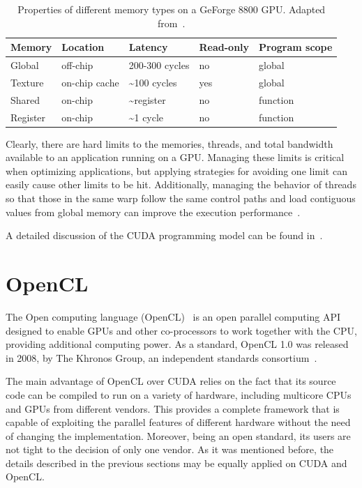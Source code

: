 \begin{table}
\caption{Properties of different memory types on a GeForge 8800 GPU. Adapted
from~\cite{Ryoo-Optimization_principles_of_a_GPU_using_CUDA:2008}.\label{tab:02-GPU_memory_properties}}


\centering

\begin{tabular}{lllll}
\hline 
Memory & Location & Latency & Read-only & Program scope\tabularnewline[\doublerulesep]
\hline 
Global & off-chip & 200-300 cycles & no & global\tabularnewline
Texture & on-chip cache & \textasciitilde{}100 cycles & yes & global\tabularnewline
Shared & on-chip & \textasciitilde{}register & no & function\tabularnewline
Register & on-chip & \textasciitilde{}1 cycle & no & function\tabularnewline
\hline 
\end{tabular}
\end{table}


Clearly, there are hard limits to the memories, threads, and total
bandwidth available to an application running on a GPU. Managing these
limits is critical when optimizing applications, but applying strategies
for avoiding one limit can easily cause other limits to be hit. Additionally,
managing the behavior of threads so that those in the same warp follow
the same control paths and load contiguous values from global memory
can improve the execution performance~\cite{Ryoo-Optimization_principles_of_a_GPU_using_CUDA:2008}.

A detailed discussion of the CUDA programming model can be found in~\cite{Farber-CUDA_application_design_and_development:2011}.


\section{OpenCL \label{sub:02-OpenCL}}

The Open computing language (OpenCL)~\cite{Stone_OpenCL.A.parallel.programming.standard:2010}
is an open parallel computing API designed to enable GPUs and other
co-processors to work together with the CPU, providing additional
computing power. As a standard, OpenCL 1.0 was released in 2008, by
The Khronos Group, an independent standards consortium~\cite{Munshi_The.OpenCL.specification:2009}.

The main advantage of OpenCL over CUDA relies on the fact that its
source code can be compiled to run on a variety of hardware, including
multicore CPUs and GPUs from different vendors. This provides a complete
framework that is capable of exploiting the parallel features of different
hardware without the need of changing the implementation. Moreover,
being an open standard, its users are not tight to the decision of
only one vendor. As it was mentioned before, the details described
in the previous sections may be equally applied on CUDA and OpenCL.


